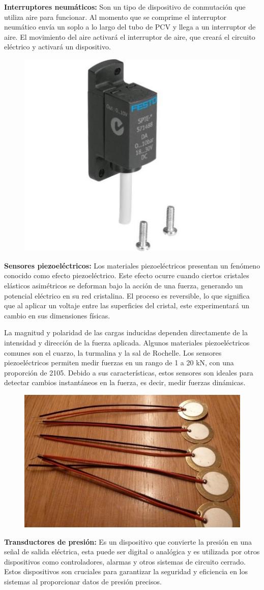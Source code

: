 \textbf{Interruptores neumáticos: }
Son un tipo de dispositivo de conmutación que utiliza aire para funcionar. Al momento que se comprime el interruptor neumático envía un soplo a lo largo del tubo de PCV y llega a un interruptor de aire. El movimiento del aire activará el interruptor de aire, que creará el circuito eléctrico y activará un dispositivo.
\begin{figure}[h]
	\centering
	\includegraphics[width=0.4\linewidth, height=0.2\textwidth]{img/neumatico}
	\caption{}
	\label{fig:neumatico}
\end{figure} 

\textbf{Sensores piezoeléctricos: }
Los materiales piezoeléctricos presentan un fenómeno conocido como efecto piezoeléctrico. Este efecto ocurre cuando ciertos cristales elásticos asimétricos se deforman bajo la acción de una fuerza, generando un potencial eléctrico en su red cristalina. El proceso es reversible, lo que significa que al aplicar un voltaje entre las superficies del cristal, este experimentará un cambio en sus dimensiones físicas.

La magnitud y polaridad de las cargas inducidas dependen directamente de la intensidad y dirección de la fuerza aplicada. Algunos materiales piezoeléctricos comunes son el cuarzo, la turmalina y la sal de Rochelle. Los sensores piezoeléctricos permiten medir fuerzas en un rango de 1 a 20 kN, con una proporción de 2105. Debido a sus características, estos sensores son ideales para detectar cambios instantáneos en la fuerza, es decir, medir fuerzas dinámicas.

\begin{figure}[h]
	\centering
	\includegraphics[width=0.4\linewidth, height=0.2\textwidth]{img/piezoele}
	\caption{}
	\label{fig:piezoele}
\end{figure} 

\textbf{Transductores de presión: }
Es un dispositivo que convierte la presión en una señal de salida eléctrica, esta puede ser digital o analógica y es utilizada por otros dispositivos como controladores, alarmas y otros sistemas de circuito cerrado. Estos dispositivos son cruciales para garantizar la seguridad y eficiencia en los sistemas al proporcionar datos de presión precisos. 



